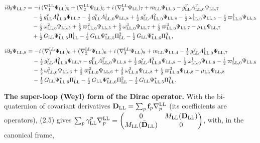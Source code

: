 \documentclass[
  10pt,
]{article}
\begin{document}
\[\begin{aligned}
i\partial_0\Psi_{{\rm LL},7}&=-i\,(\nabla^{\rm LL}_1\Psi_{\rm LL})_5+(\nabla^{\rm LL}_2\Psi_{\rm LL})_5+i\,(\nabla^{\rm LL}_3\Psi_{\rm LL})_7+m_{\rm LL}\Psi_{{\rm LL},3}-g^{\rm F}_{\rm LL}A^{\rm F}_{{\rm LL},0}\Psi_{{\rm LL},7}\\
&\quad -\tfrac{1}{2}\,g^{\rm v}_{\rm LL}A^{3}_{{\rm LL},0}\Psi_{{\rm LL},7}-\tfrac{1}{2}\,g^{\rm v}_{\rm LL}A^{1}_{{\rm LL},0}\Psi_{{\rm LL},8}+\tfrac{i}{2}\,g^{\rm v}_{\rm LL}A^{2}_{{\rm LL},0}\Psi_{{\rm LL},8}-\tfrac{1}{2}\,\omega^{1}_{{\rm LL},0}\Psi_{{\rm LL},5}-\tfrac{i}{2}\,\varpi^{1}_{{\rm LL},0}\Psi_{{\rm LL},5}\\
&\quad -\tfrac{i}{2}\,\omega^{2}_{{\rm LL},0}\Psi_{{\rm LL},5}+\tfrac{1}{2}\,\varpi^{2}_{{\rm LL},0}\Psi_{{\rm LL},5}+\tfrac{1}{2}\,\omega^{3}_{{\rm LL},0}\Psi_{{\rm LL},7}+\tfrac{i}{2}\,\varpi^{3}_{{\rm LL},0}\Psi_{{\rm LL},7}-\mu_{\rm LL}\Psi_{{\rm LL},7}\\
&\quad +\tfrac{1}{2}\,G_{\rm LL}\Psi^*_{{\rm LL},5}\Pi^1_{\rm LL}-\tfrac{i}{2}\,G_{\rm LL}\Psi^*_{{\rm LL},5}\Pi^2_{\rm LL}-\tfrac{1}{2}\,G_{\rm LL}\Psi^*_{{\rm LL},6}\Pi^3_{\rm LL},
\end{aligned}\]

\[\begin{aligned}
i\partial_0\Psi_{{\rm LL},8}&=-i\,(\nabla^{\rm LL}_1\Psi_{\rm LL})_6+(\nabla^{\rm LL}_2\Psi_{\rm LL})_6+i\,(\nabla^{\rm LL}_3\Psi_{\rm LL})_8+m_{\rm LL}\Psi_{{\rm LL},4}-\tfrac{1}{2}\,g^{\rm v}_{\rm LL}A^{1}_{{\rm LL},0}\Psi_{{\rm LL},7}\\
&\quad -\tfrac{i}{2}\,g^{\rm v}_{\rm LL}A^{2}_{{\rm LL},0}\Psi_{{\rm LL},7}-g^{\rm F}_{\rm LL}A^{\rm F}_{{\rm LL},0}\Psi_{{\rm LL},8}+\tfrac{1}{2}\,g^{\rm v}_{\rm LL}A^{3}_{{\rm LL},0}\Psi_{{\rm LL},8}-\tfrac{1}{2}\,\omega^{1}_{{\rm LL},0}\Psi_{{\rm LL},6}-\tfrac{i}{2}\,\varpi^{1}_{{\rm LL},0}\Psi_{{\rm LL},6}\\
&\quad -\tfrac{i}{2}\,\omega^{2}_{{\rm LL},0}\Psi_{{\rm LL},6}+\tfrac{1}{2}\,\varpi^{2}_{{\rm LL},0}\Psi_{{\rm LL},6}+\tfrac{1}{2}\,\omega^{3}_{{\rm LL},0}\Psi_{{\rm LL},8}+\tfrac{i}{2}\,\varpi^{3}_{{\rm LL},0}\Psi_{{\rm LL},8}-\mu_{\rm LL}\Psi_{{\rm LL},8}\\
&\quad -\tfrac{1}{2}\,G_{\rm LL}\Psi^*_{{\rm LL},6}\Pi^1_{\rm LL}-\tfrac{i}{2}\,G_{\rm LL}\Psi^*_{{\rm LL},6}\Pi^2_{\rm LL}-\tfrac{1}{2}\,G_{\rm LL}\Psi^*_{{\rm LL},5}\Pi^3_{\rm LL}.
\end{aligned}\]

\textbf{The super-loop (Weyl) form of the Dirac operator.} With the
bi-quaternion of covariant derivatives
\(\mathbf D_{\rm LL}=\sum_p\mathbf f_p\nabla^{\rm LL}_p\) (its
coefficients are operators), (2.5) gives
\(\sum_p\gamma^p_{\rm LL}\nabla^{\rm LL}_p=\begin{pmatrix}0&M_{\rm LL}(\mathbf D_{\rm LL})\\M_{\rm LL}(\bar{\mathbf D}_{\rm LL})&0\end{pmatrix}\),
with, in the canonical frame,
\end{document}

